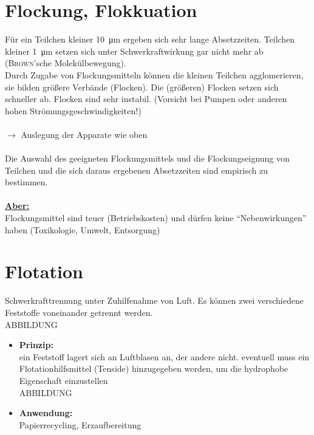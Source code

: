 \section{Flockung, Flokkuation}
Für ein Teilchen kleiner \SI{10}{\micro \meter} ergeben sich sehr lange Absetzzeiten.\linebreak
Teilchen kleiner \SI{1}{\micro \meter} setzen sich unter Schwerkraftwirkung gar nicht mehr ab (\textsc{Brown}'sche Molekülbewegung).\\
Durch Zugabe von Flockungsmitteln können die kleinen Teilchen agglomerieren, sie bilden größere Verbände (Flocken). Die (größeren) Flocken setzen sich schneller ab. Flocken sind sehr instabil. \linebreak
{\small (Vorsicht bei Pumpen oder anderen hohen Strömungsgeschwindigkeiten!)}\\ \\
$\rightarrow$ Auslegung der Apparate wie oben \\ \\
Die Auswahl des geeigneten Flockungsmittels und die Flockungseignung von Teilchen und die sich daraus ergebenen Absetzzeiten sind empirisch zu bestimmen.\\ \\
\textbf{\underline{Aber:}}\\
Flockungsmittel sind teuer (Betriebskosten) und dürfen keine "`Nebenwirkungen"' haben (Toxikologie, Umwelt, Entsorgung)

\section{Flotation}
Schwerkrafttrennung unter Zuhilfenahme von Luft. \linebreak
Es können zwei verschiedene Feststoffe voneinander getrennt werden.\\

ABBILDUNG 

\begin{itemize}
	\item \textbf{Prinzip:}\\
	ein Feststoff lagert sich an Luftblasen an, der andere nicht.\linebreak
	eventuell muss ein Flotationhilfsmittel (Tenside) hinzugegeben werden, um die hydrophobe Eigenschaft einzustellen\\
	
	ABBILDUNG\\
	
	\item \textbf{Anwendung:}\\
	Papierrecycling, Erzaufbereitung
\end{itemize}


